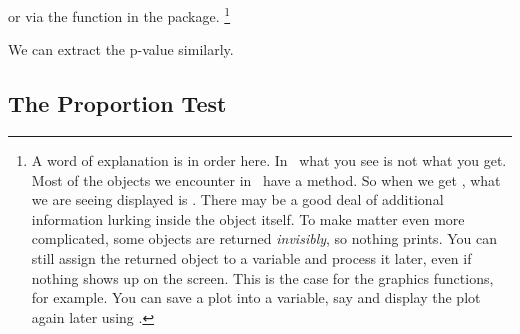 or via the  function in the  package.%
\footnote{A word of explanation is in order here.  In \R\ what you see is not 
what you get.  Most of the objects we encounter in \R\ have a 
method.  So when we get , what we are seeing displayed is
.  There may be a good deal of additional information
lurking inside the object itself.  To make matter even more complicated, some
objects are returned \emph{invisibly}, so nothing prints.  You can still assign
the returned object to a variable and process it later, even if nothing shows up
on the screen.  This is the case for the  graphics functions, for example.
You can save a plot into a variable, say  and display the plot again later 
using .}%
%
\begin{knitrout}
\end{knitrout}

We can extract the p-value similarly.
\begin{knitrout}
\end{knitrout}



\subsection{The Proportion Test}

